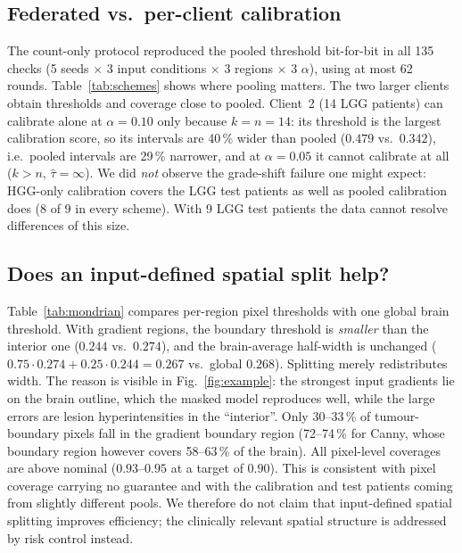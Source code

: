 \documentclass[conference]{IEEEtran}
\begin{document}
\subsection{Federated vs.\ per-client calibration}
The count-only protocol reproduced the pooled threshold bit-for-bit in all 135 checks (5 seeds $\times$ 3 input conditions $\times$ 3 regions $\times$ 3 $\alpha$), using at most 62 rounds. Table~\ref{tab:schemes} shows where pooling matters. The two larger clients obtain thresholds and coverage close to pooled. Client~2 (14 LGG patients) can calibrate alone at $\alpha{=}0.10$ only because $k=n=14$: its threshold is the largest calibration score, so its intervals are 40\,\% wider than pooled ($0.479$ vs.\ $0.342$), i.e.\ pooled intervals are 29\,\% narrower, and at $\alpha{=}0.05$ it cannot calibrate at all ($k>n$, $\hat\tau=\infty$). We did \emph{not} observe the grade-shift failure one might expect: HGG-only calibration covers the LGG test patients as well as pooled calibration does (8 of 9 in every scheme). With 9 LGG test patients the data cannot resolve differences of this size.



\subsection{Does an input-defined spatial split help?}
Table~\ref{tab:mondrian} compares per-region pixel thresholds with one global brain threshold. With gradient regions, the boundary threshold is \emph{smaller} than the interior one ($0.244$ vs.\ $0.274$), and the brain-average half-width is unchanged ($0.75\cdot0.274+0.25\cdot0.244=0.267$ vs.\ global $0.268$). Splitting merely redistributes width. The reason is visible in Fig.~\ref{fig:example}: the strongest input gradients lie on the brain outline, which the masked model reproduces well, while the large errors are lesion hyperintensities in the ``interior''. Only 30--33\,\% of tumour-boundary pixels fall in the gradient boundary region (72--74\,\% for Canny, whose boundary region however covers 58--63\,\% of the brain). All pixel-level coverages are above nominal ($0.93$--$0.95$ at a target of $0.90$). This is consistent with pixel coverage carrying no guarantee and with the calibration and test patients coming from slightly different pools. We therefore do not claim that input-defined spatial splitting improves efficiency; the clinically relevant spatial structure is addressed by risk control instead.


\end{document}
